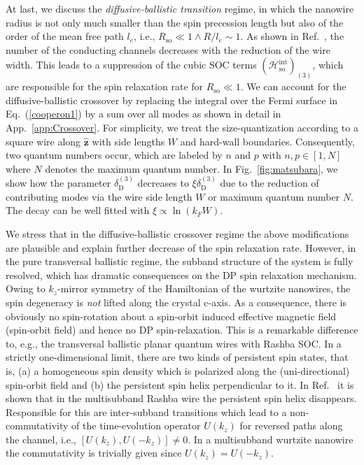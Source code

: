 \documentclass[superscriptaddress,noshowpacs,noshowkeys, twocolumn, floatfix,aps, prb,reprint]{revtex4-1}
\begin{document}
At last, we discuss the \textit{diffusive-ballistic transition} regime, in which the nanowire radius is not only much smaller than the spin precession length but also of the order of the mean free path $l_e$, i.e., $ R_\text{so}\ll 1 \wedge R/l_e \sim 1$. 
As shown in Ref.~, the number of the conducting channels decreases with the reduction of the wire width.
This leads to a suppression of the cubic SOC terms $(\mathcal{H}_\text{so}^\text{int})_{(3)}$, which are responsible for the spin relaxation rate for $R_\text{so}\ll 1$.
We can account for the diffusive-ballistic crossover by replacing the integral over the Fermi surface in Eq.~(\ref{cooperon1}) by a sum over all modes as shown in detail in App.~\ref{app:Crossover}. 
For simplicity, we treat the size-quantization according to a square wire along $\mathbf{\hat{z}}$ with side lengths $W$ and hard-wall boundaries.
Consequently, two quantum numbers occur, which are labeled by $n$ and $p$ with $n,p \in [1,N]$ where $N$ denotes the maximum quantum number.
In Fig.~\ref{fig:matsubara}, we show how the parameter $\delta_\text{D}^{(3)}$ decreases to $\xi \delta_\text{D}^{(3)}$ due to the reduction of contributing modes via the wire side length $W$ or maximum quantum number $N$.
The decay can be well fitted with $\xi \propto \ln(k_F W)$.

We stress that in the diffusive-ballistic crossover regime the above modifications are plausible and explain further decrease of the spin relaxation rate.
However, in the pure transversal ballistic regime, the subband structure of the system is fully resolved, which has dramatic consequences on the DP spin relaxation mechanism.
Owing to $k_z$-mirror symmetry of the Hamiltonian of the wurtzite nanowires, the spin degeneracy is \textit{not} lifted along the crystal c-axis.
As a consequence, there is obviously no spin-rotation about a spin-orbit induced effective magnetic field (spin-orbit field) and hence no DP spin-relaxation.
This is a remarkable difference to, e.g., the transversal ballistic planar quantum wires with Rashba SOC.
In a strictly one-dimensional limit, there are two kinds of persistent spin states, that is, (a) a homogeneous spin density which is polarized along the (uni-directional) spin-orbit field and (b) the persistent spin helix perpendicular to it.\cite{wenkdiss}
In Ref.~ it is shown that in the multisubband Rashba wire the persistent spin helix disappears.
Responsible for this are inter-subband transitions which lead to a non-commutativity of the time-evolution operator $U(k_z)$ for reversed paths along the channel, i.e., $[U(k_z),U(-k_z)]\neq 0$.
In a multisubband wurtzite nanowire the commutativity is trivially given since $U(k_z)=U(-k_z)$.
\end{document}
